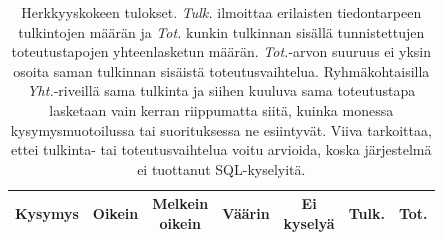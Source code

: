 \setlength{\tabcolsep}{4pt}
\begin{longtable}{lcccccc}
  \caption{Herkkyyskokeen tulokset. \textit{Tulk.} ilmoittaa
    erilaisten tiedontarpeen tulkintojen määrän ja \textit{Tot.}
    kunkin tulkinnan sisällä tunnistettujen toteutustapojen
    yhteenlasketun määrän. \textit{Tot.}-arvon suuruus ei yksin
    osoita saman tulkinnan sisäistä toteutusvaihtelua.
    Ryhmäkohtaisilla \textit{Yht.}-riveillä sama tulkinta ja
    siihen kuuluva sama toteutustapa lasketaan vain kerran
    riippumatta siitä, kuinka monessa kysymysmuotoilussa tai
    suorituksessa ne esiintyvät. Viiva tarkoittaa, ettei
    tulkinta- tai toteutusvaihtelua voitu arvioida, koska
  järjestelmä ei tuottanut SQL-kyselyitä.}
  \label{tb:sensitivity} \\
  \toprule
  Kysymys & Oikein & \makecell{Melkein\\oikein} & Väärin &
  \makecell{Ei\\kyselyä} & Tulk. & Tot. \\
  \midrule
  \endfirsthead


\end{longtable}
